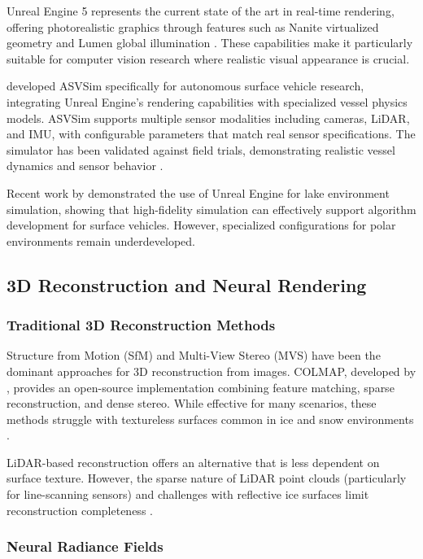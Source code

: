 Unreal Engine 5 represents the current state of the art in real-time rendering, offering photorealistic graphics through features such as Nanite virtualized geometry and Lumen global illumination \parencite{epic2023unreal}. These capabilities make it particularly suitable for computer vision research where realistic visual appearance is crucial.

\citeauthor{schroeder2020asvsim} developed ASVSim specifically for autonomous surface vehicle research, integrating Unreal Engine's rendering capabilities with specialized vessel physics models. ASVSim supports multiple sensor modalities including cameras, LiDAR, and IMU, with configurable parameters that match real sensor specifications. The simulator has been validated against field trials, demonstrating realistic vessel dynamics and sensor behavior \parencite{schroeder2022validation}.

Recent work by \citeauthor{ebadi2020lakes} demonstrated the use of Unreal Engine for lake environment simulation, showing that high-fidelity simulation can effectively support algorithm development for surface vehicles. However, specialized configurations for polar environments remain underdeveloped.

\subsection{3D Reconstruction and Neural Rendering}

\subsubsection{Traditional 3D Reconstruction Methods}

Structure from Motion (SfM) and Multi-View Stereo (MVS) have been the dominant approaches for 3D reconstruction from images. COLMAP, developed by \citeauthor{schoenberger2016sfm}, provides an open-source implementation combining feature matching, sparse reconstruction, and dense stereo. While effective for many scenarios, these methods struggle with textureless surfaces common in ice and snow environments \parencite{zhang2020critical}.

LiDAR-based reconstruction offers an alternative that is less dependent on surface texture. However, the sparse nature of LiDAR point clouds (particularly for line-scanning sensors) and challenges with reflective ice surfaces limit reconstruction completeness \parencite{kuemmerle2018lidar}.

\subsubsection{Neural Radiance Fields}

